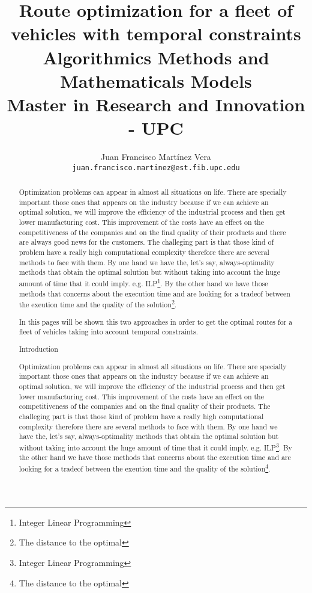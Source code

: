 \documentclass[]{report}
\title{{\Huge Route optimization for a fleet of vehicles with temporal constraints} \\
Algorithmics Methods and Mathematicals Models \\
Master in Research and Innovation - UPC}
\author{Juan Francisco Mart\'inez Vera \\
{\tt juan.francisco.martinez@est.fib.upc.edu}}
\begin{document}
\maketitle


\begin{abstract}
	Optimization problems can appear in almost all situations on life. There are specially important those ones that appears on the industry because if we can achieve an optimal solution, we will improve the efficiency of the industrial process and then get lower manufacturing cost. This improvement of the costs have an effect on the competitiveness of the companies and on the final quality of their products and there are always good news for the customers. The challeging part is that those kind of problem have a really high computational complexity therefore there are several methods to face with them. By one hand we have the, let's say, always-optimality methods that obtain the optimal solution but without taking into account the huge amount of time that it could imply. e.g. ILP\footnote{Integer Linear Programming}. By the other hand we have those methods that concerns about the execution time and are looking for a tradeof between the exeution time and the quality of the solution\footnote{The distance to the optimal}.
	
	In this pages will be shown this two approaches in order to get the optimal routes for a fleet of vehicles taking into account temporal constraints.
	
\tableofcontents
	
\chapter{Introduction}
	Optimization problems can appear in almost all situations on life. There are specially important those ones that appears on the industry because if we can achieve an optimal solution, we will improve the efficiency of the industrial process and then get lower manufacturing cost. This improvement of the costs have an effect on the competitiveness of the companies and on the final quality of their products. The challeging part is that those kind of problem have a really high computational complexity therefore there are several methods to face with them. By one hand we have the, let's say, always-optimality methods that obtain the optimal solution but without taking into account the huge amount of time that it could imply. e.g. ILP\footnote{Integer Linear Programming}. By the other hand we have those methods that concerns about the execution time and are looking for a tradeof between the exeution time and the quality of the solution\footnote{The distance to the optimal}.
	

\end{abstract}
\end{document}
